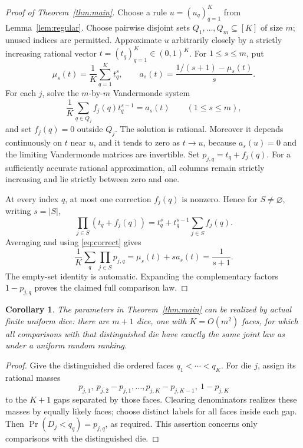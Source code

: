 \documentclass[11pt]{article}
\newtheorem{corollary}[theorem]{Corollary}
\begin{document}
\begin{proof}[Proof of Theorem~\ref{thm:main}]
Choose a rule $u=(u_q)_{q=1}^K$ from Lemma~\ref{lem:regular}.
Choose pairwise disjoint sets $Q_1,\ldots,Q_m\subseteq[K]$ of size $m$;
unused indices are permitted. Approximate $u$ arbitrarily closely by a
strictly increasing rational vector $t=(t_q)_{q=1}^K\in(0,1)^K$.
For $1\leq s\leq m$, put
\[
 \mu_s(t)=\frac1K\sum_{q=1}^Kt_q^s,
 \qquad a_s(t)=\frac{1/(s+1)-\mu_s(t)}s.
\]
For each $j$, solve the $m$-by-$m$ Vandermonde system
\begin{equation}\label{eq:correct}
 \frac1K\sum_{q\in Q_j}f_j(q)t_q^{s-1}=a_s(t)
          \qquad(1\leq s\leq m),
\end{equation}
and set $f_j(q)=0$ outside $Q_j$.
The solution is rational. Moreover it depends continuously on $t$ near $u$,
and it tends to zero as $t\to u$, because $a_s(u)=0$ and the limiting
Vandermonde matrices are invertible.
Set $p_{j,q}=t_q+f_j(q)$. For a sufficiently accurate rational approximation,
all columns remain strictly increasing and lie strictly between zero and one.

At every index $q$, at most one correction $f_j(q)$ is nonzero. Hence for
$S\ne\varnothing$, writing $s=|S|$,
\[
 \prod_{j\in S}(t_q+f_j(q))
   =t_q^s+t_q^{s-1}\sum_{j\in S}f_j(q).
\]
Averaging and using \eqref{eq:correct} gives
\[
 \frac1K\sum_q\prod_{j\in S}p_{j,q}
   =\mu_s(t)+s a_s(t)=\frac1{s+1}.
\]
The empty-set identity is automatic. Expanding the complementary factors
$1-p_{j,q}$ proves the claimed full comparison law.
\end{proof}

\begin{corollary}
The parameters in Theorem~\ref{thm:main} can be realized by actual finite
uniform dice: there are $m+1$ dice, one with $K=O(m^2)$ faces, for which
all comparisons with that distinguished die have exactly the same joint
law as under a uniform random ranking.
\end{corollary}
\begin{proof}
Give the distinguished die ordered faces $q_1<\cdots<q_K$.
For die $j$, assign its rational masses
\[
 p_{j,1},\ p_{j,2}-p_{j,1},\ldots,p_{j,K}-p_{j,K-1},\ 1-p_{j,K}
\]
to the $K+1$ gaps separated by those faces. Clearing denominators realizes
these masses by equally likely faces; choose distinct labels for all faces
inside each gap. Then $\Pr(D_j<q_q)=p_{j,q}$, as required.
This assertion concerns only comparisons with the distinguished die.
\end{proof}
\end{document}
